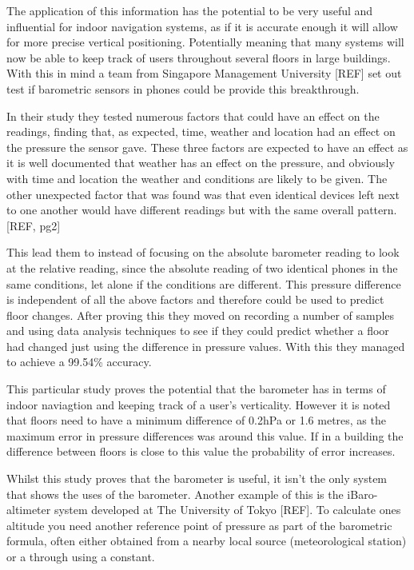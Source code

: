 \documentclass[main.tex]{subfiles}
\begin{document}
The application of this information has the potential to be very useful and influential for indoor navigation systems, as if it is accurate enough it will allow for more precise vertical positioning. Potentially meaning that many systems will now be able to keep track of users throughout several floors in large buildings. With this in mind a team from Singapore Management University [REF] set out test if barometric sensors in phones could be provide this breakthrough.

In their study they tested numerous factors that could have an effect on the readings, finding that, as expected, time, weather and location had an effect on the pressure the sensor gave. These three factors are expected to have an effect as it is well documented that weather has an effect on the pressure, and obviously with time and location the weather and conditions are likely to be given. The other unexpected factor that was found was that even identical devices left next to one another would have different readings but with the same overall pattern. [REF, pg2]

This lead them to instead of focusing on the absolute barometer reading to look at the relative reading, since the absolute reading of two identical phones in the same conditions, let alone if the conditions are different. This pressure difference is independent of all the above factors and therefore could be used to predict floor changes. After proving this they moved on recording a number of samples and using data analysis techniques to see if they could predict whether a floor had changed just using the difference in pressure values. With this they managed to achieve a 99.54\% accuracy.

This particular study proves the potential that the barometer has in terms of indoor naviagtion and keeping track of a user's verticality. However it is noted that floors need to have a minimum difference of 0.2hPa or 1.6 metres, as the maximum error in pressure differences was around this value. If in a building the difference between floors is close to this value the probability of error increases.

Whilst this study proves that the barometer is useful, it isn't the only system that shows the uses of the barometer. Another example of this is the iBaro-altimeter system developed at The University of Tokyo [REF]. To calculate ones altitude you need another reference point of pressure as part of the barometric formula, often either obtained from a nearby local source (meteorological station) or a through using a constant.
\end{document}
